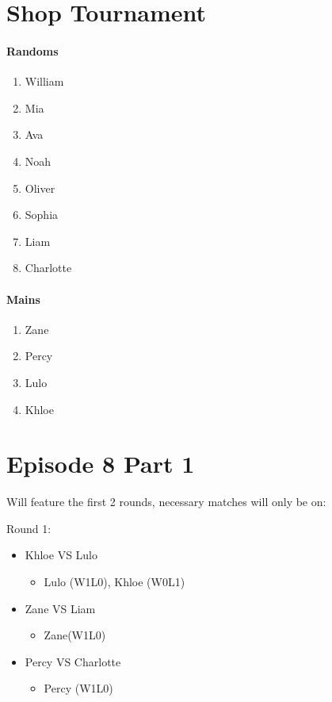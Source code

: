 \section*{Shop Tournament}
\paragraph{Randoms}
\begin{enumerate}
   \item William
   \item Mia
   \item Ava
   \item Noah
   \item Oliver
   \item Sophia
   \item Liam
   \item Charlotte
\end{enumerate}

\paragraph{Mains}
\begin{enumerate}
   \item Zane
   \item Percy
   \item Lulo
   \item Khloe
\end{enumerate}

\section{Episode 8 Part 1}
Will feature the first 2 rounds, necessary matches will only be on:
\par \noindent Round 1:
\begin{itemize}
   \item Khloe VS Lulo
   \begin{itemize}
      \item Lulo (W1L0), Khloe (W0L1)
   \end{itemize}
   \item Zane VS Liam
   \begin{itemize}
      \item Zane(W1L0)
   \end{itemize}
   \item Percy VS Charlotte
   \begin{itemize}
      \item Percy (W1L0)
   \end{itemize}
\end{itemize}

